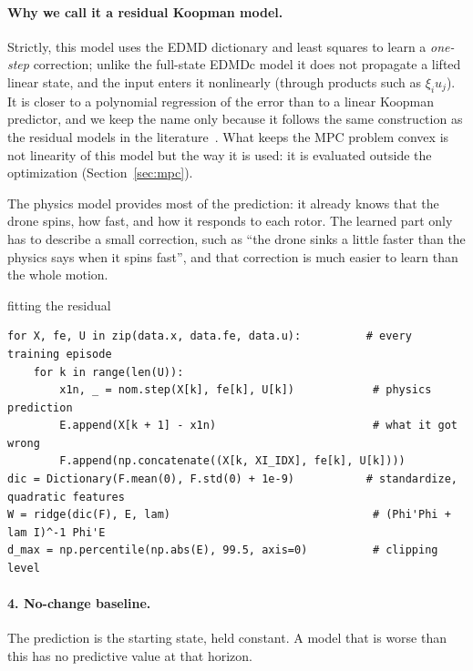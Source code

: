 \paragraph{Why we call it a residual Koopman model.} Strictly, this model uses the EDMD dictionary and least squares to learn a \emph{one-step} correction; unlike the full-state EDMDc model it does not propagate a lifted linear state, and the input enters it nonlinearly (through products such as $\xi_i u_j$). It is closer to a polynomial regression of the error than to a linear Koopman predictor, and we keep the name only because it follows the same construction as the residual models in the literature~\cite{todde2026residual,narayanan2026rkmpc}. What keeps the MPC problem convex is not linearity of this model but the way it is used: it is evaluated outside the optimization (Section~\ref{sec:mpc}).

\begin{plain}
The physics model provides most of the prediction: it already knows that the drone spins, how fast, and how it responds to each rotor. The learned part only has to describe a small correction, such as ``the drone sinks a little faster than the physics says when it spins fast'', and that correction is much easier to learn than the whole motion.
\end{plain}

\begin{codebox}{fitting the residual}
\begin{lstlisting}
for X, fe, U in zip(data.x, data.fe, data.u):          # every training episode
    for k in range(len(U)):
        x1n, _ = nom.step(X[k], fe[k], U[k])            # physics prediction
        E.append(X[k + 1] - x1n)                        # what it got wrong
        F.append(np.concatenate((X[k, XI_IDX], fe[k], U[k])))
dic = Dictionary(F.mean(0), F.std(0) + 1e-9)           # standardize, quadratic features
W = ridge(dic(F), E, lam)                               # (Phi'Phi + lam I)^-1 Phi'E
d_max = np.percentile(np.abs(E), 99.5, axis=0)          # clipping level
\end{lstlisting}
\end{codebox}

\paragraph{4. No-change baseline.} The prediction is the starting state, held constant. A model that is worse than this has no predictive value at that horizon.

